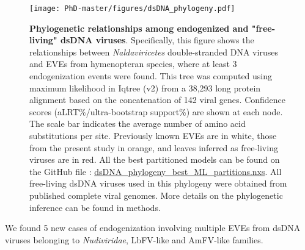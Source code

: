\begin{figure}[!htbp]
 \centering
  \texttt{[image: PhD-master/figures/dsDNA\_phylogeny.pdf]}
\caption[Paper1:Phylogenetic relationships among endogenized and "free-living" dsDNA viruses]{\textbf{Phylogenetic relationships among endogenized and "free-living" dsDNA viruses}. Specifically, this figure shows the relationships between \textit{Naldaviricetes} double-stranded DNA viruses and EVEs from hymenopteran species, where at least 3 endogenization events were found. This tree was computed using maximum likelihood in Iqtree (v2) from a 38,293 long protein alignment based on the concatenation of 142 viral genes. Confidence scores (aLRT\%/ultra-bootstrap support\%) are shown at each node. The scale bar indicates the average number of amino acid substitutions per site. Previously known EVEs  are in white, those from the present study in orange, and leaves inferred as free-living viruses are in red.  All the best partitioned models can be found on the GitHub file : \href{https://github.com/BenjaminGuinet/PhD_defense/blob/main/Supplementary_paper1/dsDNA_phylogeny_best_ML_partitions.nxs}{dsDNA\_phylogeny\_best\_ML\_partitions.nxs}. All free-living dsDNA viruses used in this phylogeny were obtained from published complete viral genomes. More details on the phylogenetic inference can be found in methods.}
\label{figure:dsDNA_phylogeny}
\end{figure}

We found 5 new cases of endogenization involving multiple EVEs from dsDNA viruses belonging to \textit{Nudiviridae}, LbFV-like and AmFV-like families. 

